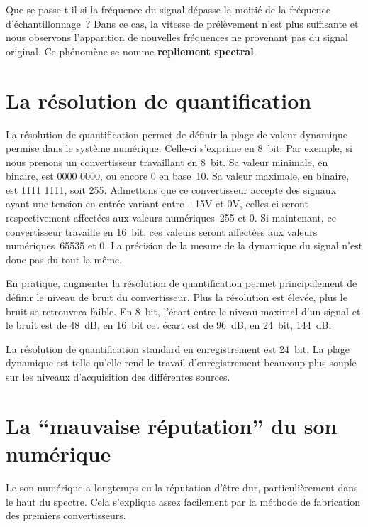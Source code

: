 \documentclass[
]{book}
\begin{document}
Que se passe-t-il si la fréquence du signal dépasse la moitié de la fréquence d'échantillonnage~? Dans ce cas, la vitesse de prélèvement n'est plus suffisante et nous observons l'apparition de nouvelles fréquences ne provenant pas du signal original. Ce phénomène se nomme \textbf{repliement spectral}.

\hypertarget{la-ruxe9solution-de-quantification}{%
\section{La résolution de quantification}\label{la-ruxe9solution-de-quantification}}

La résolution de quantification permet de définir la plage de valeur dynamique permise dans le système numérique. Celle-ci s'exprime en 8~bit. Par exemple, si nous prenons un convertisseur travaillant en 8~bit. Sa valeur minimale, en binaire, est 0000 0000, ou encore 0 en base~10. Sa valeur maximale, en binaire, est 1111 1111, soit 255. Admettons que ce convertisseur accepte des signaux ayant une tension en entrée variant entre +15V et 0V, celles-ci seront respectivement affectées aux valeurs numériques~255 et 0. Si maintenant, ce convertisseur travaille en 16~bit, ces valeurs seront affectées aux valeurs numériques~65535 et 0. La précision de la mesure de la dynamique du signal n'est donc pas du tout la même.

En pratique, augmenter la résolution de quantification permet principalement de définir le niveau de bruit du convertisseur. Plus la résolution est élevée, plus le bruit se retrouvera faible. En 8~bit, l'écart entre le niveau maximal d'un signal et le bruit est de 48~dB, en 16~bit cet écart est de 96~dB, en 24~bit, 144~dB.

La résolution de quantification standard en enregistrement est 24~bit. La plage dynamique est telle qu'elle rend le travail d'enregistrement beaucoup plus souple sur les niveaux d'acquisition des différentes sources.

\hypertarget{la-mauvaise-ruxe9putation-du-son-numuxe9rique}{%
\section{La ``mauvaise réputation'' du son numérique}\label{la-mauvaise-ruxe9putation-du-son-numuxe9rique}}

Le son numérique a longtemps eu la réputation d'être dur, particulièrement dans le haut du spectre. Cela s'explique assez facilement par la méthode de fabrication des premiers convertisseurs.
\end{document}
